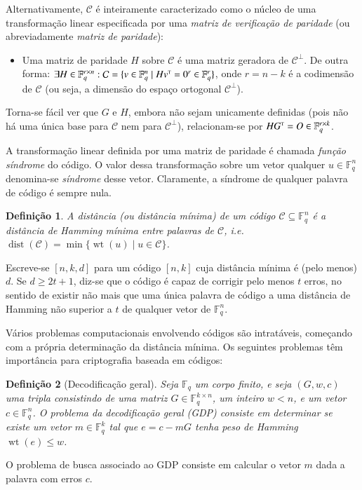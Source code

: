 \documentclass{SBCbookchapter}
\newcommand{\F}{\mathbb{F}}
\newcommand{\tp}{\textrm{\tiny T}}
\DeclareMathOperator{\dist}{dist}
\DeclareMathOperator{\wt}{wt}
\newtheorem{definition}{Definição}{\bfseries}{\itshape}
\begin{document}
\begin{otherlanguage}{brazilian}
Alternativamente, $\mathcal{C}$ é inteiramente caracterizado como o núcleo de uma transformação linear especificada por uma \emph{matriz de verificação de paridade} (ou abreviadamente \emph{matriz de paridade}): 

\begin{itemize}
    \item Uma matriz de paridade $H$ sobre $\mathcal{C}$ é uma matriz geradora de $\mathcal{C}^\bot$. De outra forma: $\exists H \in \F_q^{r \times n} : \mathcal{C} = \{ v \in \F_q^n \mid H v^{\tp} = 0^r \in \F_q^r \}$, onde $r = n - k$ é a codimensão de $\mathcal{C}$ (ou seja, a dimensão do espaço ortogonal $\mathcal{C}^\bot$).
\end{itemize}

Torna-se fácil ver que $G$ e $H$, embora não sejam unicamente definidas (pois não há uma única base para $\mathcal{C}$ nem para $\mathcal{C}^\bot$), relacionam-se por $H G^{\tp} = O \in \F_q^{r \times k}$.

A transformação linear definida por uma matriz de paridade é chamada \emph{função síndrome} do código. O valor dessa transformação sobre um vetor qualquer $u \in \F_q^n$ denomina-se \emph{síndrome} desse vetor. Claramente, a síndrome de qualquer palavra de código é sempre nula.


\begin{definition}\label{def:codedist}
A \emph{distância} (ou \emph{distância mínima}) de um código $\mathcal{C} \subseteq \F_q^n$ é a distância de Hamming mínima entre palavras de $\mathcal{C}$, i.e. $\dist(\mathcal{C}) = \min\{\wt(u) \mid u \in \mathcal{C}\}$.
\end{definition}
Escreve-se $[n,k,d]$ para um código $[n,k]$ cuja distância mínima é (pelo menos) $d$. Se $d \geqslant 2t + 1$, diz-se que o código é capaz de corrigir pelo menos $t$ erros, no sentido de existir não mais que uma única palavra de código a uma distância de Hamming não superior a $t$ de qualquer vetor de $\F_q^n$.

Vários problemas computacionais envolvendo códigos são intratáveis, começando com a própria determinação da distância mínima. Os seguintes problemas têm importância para criptografia baseada em códigos:

\begin{definition}[Decodificação geral]\label{def:gdp}
Seja $\F_q$ um corpo finito, e seja $(G, w, c)$ uma tripla consistindo de uma matriz $G \in \F_q^{k \times n}$, um inteiro $w < n$, e um vetor $c \in \F_q^{n}$. O \emph{problema da decodificação geral (GDP)} consiste em determinar se existe um vetor $m \in \F_q^{k}$ tal que $e = c - mG$ tenha peso de Hamming $\wt(e) \leqslant w$.
\end{definition}
O problema de busca associado ao GDP consiste em calcular o vetor $m$ dada a palavra com erros $c$.


\end{otherlanguage}
\end{document}
